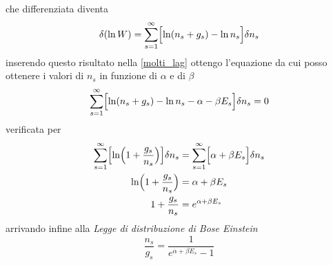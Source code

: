 che differenziata diventa
\begin{equation}
\delta (\ln W) = \sum_{s=1}^{\infty} \Bigl[ \ln(n_s + g_s) - \ln n_s \Bigr] \delta n_s
\end{equation}
inserendo questo risultato nella \ref{molti_lag} ottengo l'equazione 
da cui posso ottenere i valori di $n_s$ in funzione di $\alpha$ e di $\beta$
\begin{equation}
\sum_{s=1}^{\infty} \Bigl[ \ln(n_s + g_s) - \ln n_s - \alpha -\beta E_s\Bigr] \delta n_s = 0
\end{equation}
verificata per 
\begin{equation}
\begin{split}
\sum_{s=1}^{\infty} \Bigl[ \ln \Bigl(  1 + \frac{ g_s}{n_s }  \Bigr) \Bigr]\delta n_s & = \sum_{s=1}^{\infty} \Bigl[ \alpha + \beta E_s \Bigr]\delta n_s \\
\ln \Bigl(  1 + \frac{ g_s}{n_s}  \Bigr) &= \alpha + \beta E_s \\
1 + \frac{ g_s}{n_s} & = e^{ \alpha + \beta E_s  }
\end{split}
\end{equation}
arrivando infine alla \textit{Legge di distribuzione di Bose Einstein}
\begin{equation}
\frac{ n_s}{g_s } = \frac{ 1}{e^{\alpha +\beta E_s} - 1 }
\label{dist_BE}
\end{equation}



